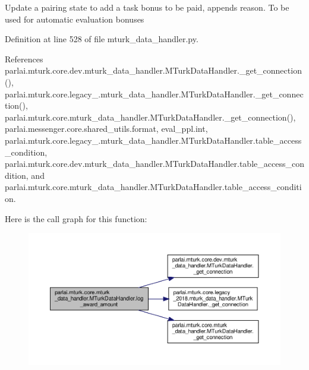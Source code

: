 \begin{DoxyVerb}Update a pairing state to add a task bonus to be paid,
appends reason. To be used for automatic evaluation bonuses
\end{DoxyVerb}
 

Definition at line 528 of file mturk\+\_\+data\+\_\+handler.\+py.



References parlai.\+mturk.\+core.\+dev.\+mturk\+\_\+data\+\_\+handler.\+M\+Turk\+Data\+Handler.\+\_\+get\+\_\+connection(), parlai.\+mturk.\+core.\+legacy\+\_.\+mturk\+\_\+data\+\_\+handler.\+M\+Turk\+Data\+Handler.\+\_\+get\+\_\+connection(), parlai.\+mturk.\+core.\+mturk\+\_\+data\+\_\+handler.\+M\+Turk\+Data\+Handler.\+\_\+get\+\_\+connection(), parlai.\+messenger.\+core.\+shared\+\_\+utils.\+format, eval\+\_\+ppl.\+int, parlai.\+mturk.\+core.\+legacy\+\_.\+mturk\+\_\+data\+\_\+handler.\+M\+Turk\+Data\+Handler.\+table\+\_\+access\+\_\+condition, parlai.\+mturk.\+core.\+dev.\+mturk\+\_\+data\+\_\+handler.\+M\+Turk\+Data\+Handler.\+table\+\_\+access\+\_\+condition, and parlai.\+mturk.\+core.\+mturk\+\_\+data\+\_\+handler.\+M\+Turk\+Data\+Handler.\+table\+\_\+access\+\_\+condition.

Here is the call graph for this function\+:
\nopagebreak
\begin{figure}[H]
\begin{center}
\leavevmode
\includegraphics[width=350pt]{classparlai_1_1mturk_1_1core_1_1mturk__data__handler_1_1MTurkDataHandler_a399c5d70b0e2509b061f0d0f627a3f01_cgraph}
\end{center}
\end{figure}
\mbox{\label{classparlai_1_1mturk_1_1core_1_1mturk__data__handler_1_1MTurkDataHandler_af62327d533f06297786cd37c8833289a}} 

